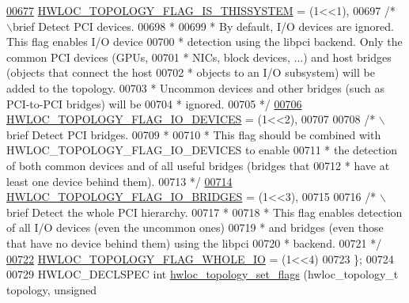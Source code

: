 \begin{DoxyCode}
\hypertarget{a00033_source_l00677}{}\hyperlink{a00044_ggada025d3ec20b4b420f8038d23d6e7bdea6ecb6abc6a0bb75e81564f8bca85783b}{00677}   \hyperlink{a00044_ggada025d3ec20b4b420f8038d23d6e7bdea6ecb6abc6a0bb75e81564f8bca85783b}{HWLOC_TOPOLOGY_FLAG_IS_THISSYSTEM} = (1<<1),
00697   \textcolor{comment}{/* \(\backslash\)brief Detect PCI devices.}
00698 \textcolor{comment}{   *}
00699 \textcolor{comment}{   * By default, I/O devices are ignored. This flag enables I/O device}
00700 \textcolor{comment}{   * detection using the libpci backend. Only the common PCI devices (GPUs,}
00701 \textcolor{comment}{   * NICs, block devices, ...) and host bridges (objects that connect the host}
00702 \textcolor{comment}{   * objects to an I/O subsystem) will be added to the topology.}
00703 \textcolor{comment}{   * Uncommon devices and other bridges (such as PCI-to-PCI bridges) will be}
00704 \textcolor{comment}{   * ignored.}
00705 \textcolor{comment}{   */}
\hypertarget{a00033_source_l00706}{}\hyperlink{a00044_ggada025d3ec20b4b420f8038d23d6e7bdea46ae25e8896278840b1800ae9ce4de41}{00706}   \hyperlink{a00044_ggada025d3ec20b4b420f8038d23d6e7bdea46ae25e8896278840b1800ae9ce4de41}{HWLOC_TOPOLOGY_FLAG_IO_DEVICES} = (1<<2),
00707 
00708   \textcolor{comment}{/* \(\backslash\)brief Detect PCI bridges.}
00709 \textcolor{comment}{   *}
00710 \textcolor{comment}{   * This flag should be combined with HWLOC\_TOPOLOGY\_FLAG\_IO\_DEVICES to enable}
00711 \textcolor{comment}{   * the detection of both common devices and of all useful bridges (bridges that
      }
00712 \textcolor{comment}{   * have at least one device behind them).}
00713 \textcolor{comment}{   */}
\hypertarget{a00033_source_l00714}{}\hyperlink{a00044_ggada025d3ec20b4b420f8038d23d6e7bdea426b18c349f15d7046bb391d96fa947c}{00714}   \hyperlink{a00044_ggada025d3ec20b4b420f8038d23d6e7bdea426b18c349f15d7046bb391d96fa947c}{HWLOC_TOPOLOGY_FLAG_IO_BRIDGES} = (1<<3),
00715 
00716   \textcolor{comment}{/* \(\backslash\)brief Detect the whole PCI hierarchy.}
00717 \textcolor{comment}{   *}
00718 \textcolor{comment}{   * This flag enables detection of all I/O devices (even the uncommon ones)}
00719 \textcolor{comment}{   * and bridges (even those that have no device behind them) using the libpci}
00720 \textcolor{comment}{   * backend.}
00721 \textcolor{comment}{   */}
\hypertarget{a00033_source_l00722}{}\hyperlink{a00044_ggada025d3ec20b4b420f8038d23d6e7bdea4a41dc181649ef81c2dcd44a54e271b9}{00722}   \hyperlink{a00044_ggada025d3ec20b4b420f8038d23d6e7bdea4a41dc181649ef81c2dcd44a54e271b9}{HWLOC_TOPOLOGY_FLAG_WHOLE_IO} = (1<<4)
00723 \};
00724 
00729 HWLOC\_DECLSPEC \textcolor{keywordtype}{int} \hyperlink{a00044_ga6d11e53db143ac39c32cdb3912b71f99}{hwloc_topology_set_flags} (hwloc\_topology\_t topology, \textcolor{keywordtype}{unsigned} 

\end{DoxyCode}
